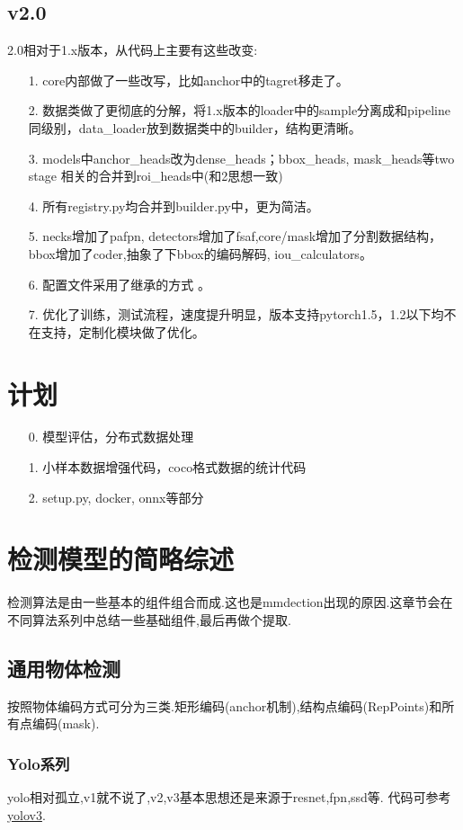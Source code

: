 \documentclass[UTF8]{ctexart}
\begin{document}
\subsection{v2.0}
2.0相对于1.x版本，从代码上主要有这些改变:
\begin{itemize}
	\item[1.] core内部做了一些改写，比如anchor中的tagret移走了。
	\item[2.] 数据类做了更彻底的分解，将1.x版本的loader中的sample分离成和pipeline同级别，data\_loader放到数据类中的builder，结构更清晰。
	\item[3.] models中anchor\_heads改为dense\_heads；bbox\_heads, mask\_heads等two stage 相关的合并到roi\_heads中(和2思想一致)
	\item[4.] 所有registry.py均合并到builder.py中，更为简洁。
	\item[5.] necks增加了pafpn, detectors增加了fsaf,core/mask增加了分割数据结构，bbox增加了coder,抽象了下bbox的编码解码, iou\_calculators。
	\item[6.] 配置文件采用了继承的方式 。
	\item[7.] 优化了训练，测试流程，速度提升明显，版本支持pytorch1.5，1.2以下均不在支持，定制化模块做了优化。
\end{itemize}

\section{计划}
\begin{itemize}
	\item [0.]  模型评估，分布式数据处理
	\item [1.] 小样本数据增强代码，coco格式数据的统计代码
	\item [2.] setup.py, docker, onnx等部分
\end{itemize}

\section{检测模型的简略综述}
检测算法是由一些基本的组件组合而成.这也是mmdection出现的原因.这章节会在不同算法系列中总结一些基础组件,最后再做个提取.
\subsection{通用物体检测}
按照物体编码方式可分为三类.矩形编码(anchor机制),结构点编码(RepPoints)和所有点编码(mask).
\subsubsection{Yolo系列}
yolo相对孤立,v1就不说了,v2,v3基本思想还是来源于resnet,fpn,ssd等.
代码可参考 \href{https://github.com/ultralytics/yolov3}{yolov3}.
\end{document}
